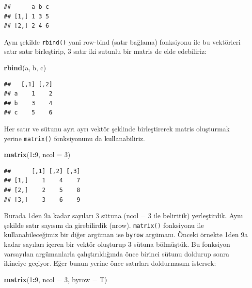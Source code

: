 \documentclass[]{book}
\newenvironment{Shaded}{\begin{snugshade}}{\end{snugshade}}
\newcommand{\DataTypeTok}[1]{\textcolor[rgb]{0.13,0.29,0.53}{#1}}
\newcommand{\DecValTok}[1]{\textcolor[rgb]{0.00,0.00,0.81}{#1}}
\newcommand{\KeywordTok}[1]{\textcolor[rgb]{0.13,0.29,0.53}{\textbf{#1}}}
\newcommand{\NormalTok}[1]{#1}
\newcommand{\OperatorTok}[1]{\textcolor[rgb]{0.81,0.36,0.00}{\textbf{#1}}}
\begin{document}
\begin{verbatim}
##      a b c
## [1,] 1 3 5
## [2,] 2 4 6
\end{verbatim}

Aynı şekilde \texttt{rbind()} yani row-bind (satır bağlama) fonksiyonu
ile bu vektörleri satır satır birleştirip, 3 satır iki sutunlu bir
matris de elde edebiliriz:

\begin{Shaded}
\begin{Highlighting}[]
\KeywordTok{rbind}\NormalTok{(a, b, c)}
\end{Highlighting}
\end{Shaded}

\begin{verbatim}
##   [,1] [,2]
## a    1    2
## b    3    4
## c    5    6
\end{verbatim}

Her satır ve sütunu ayrı ayrı vektör şeklinde birleştirerek matris
oluşturmak yerine \texttt{matrix()} fonksiyonunu da kullanabiliriz.

\begin{Shaded}
\begin{Highlighting}[]
\KeywordTok{matrix}\NormalTok{(}\DecValTok{1}\OperatorTok{:}\DecValTok{9}\NormalTok{, }\DataTypeTok{ncol =} \DecValTok{3}\NormalTok{)}
\end{Highlighting}
\end{Shaded}

\begin{verbatim}
##      [,1] [,2] [,3]
## [1,]    1    4    7
## [2,]    2    5    8
## [3,]    3    6    9
\end{verbatim}

Burada 1den 9a kadar sayıları 3 sütuna (ncol = 3 ile belirttik)
yerleştirdik. Aynı şekilde satır sayısını da girebilirdik (nrow).
\texttt{matrix()} fonksiyonu ile kullanabileceğimiz bir diğer argüman
ise \texttt{byrow} argümanı. Önceki örnekte 1den 9a kadar sayıları
içeren bir vektör oluşturup 3 sütuna bölmüştük. Bu fonksiyon varsayılan
argümanlarla çalıştırıldığında önce birinci sütunu doldurup sonra
ikinciye geçiyor. Eğer bunun yerine önce satırları doldurmasını
istersek:

\begin{Shaded}
\begin{Highlighting}[]
\KeywordTok{matrix}\NormalTok{(}\DecValTok{1}\OperatorTok{:}\DecValTok{9}\NormalTok{, }\DataTypeTok{ncol =} \DecValTok{3}\NormalTok{, }\DataTypeTok{byrow =}\NormalTok{ T)}
\end{Highlighting}
\end{Shaded}
\end{document}
